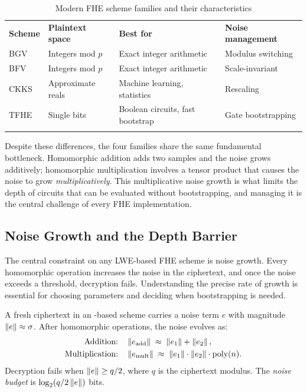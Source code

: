 \begin{table}[t]
\caption{Modern FHE scheme families and their characteristics}
\label{tab:fhe-schemes}
\begin{tabular}{p{2cm}p{3.5cm}p{3cm}p{3cm}}
\hline\noalign{\smallskip}
\textbf{Scheme} & \textbf{Plaintext space} & \textbf{Best for} & \textbf{Noise management} \\
\noalign{\smallskip}\svhline\noalign{\smallskip}
BGV & Integers mod $p$ & Exact integer arithmetic & Modulus switching \\
BFV & Integers mod $p$ & Exact integer arithmetic & Scale-invariant \\
CKKS & Approximate reals & Machine learning, statistics & Rescaling \\
TFHE & Single bits & Boolean circuits, fast bootstrap & Gate bootstrapping \\
\noalign{\smallskip}\hline
\end{tabular}
\end{table}

Despite these differences, the four families share the same fundamental bottleneck.  Homomorphic addition adds two \lwe{} samples and the noise grows additively; homomorphic multiplication involves a tensor product that causes the noise to grow \emph{multiplicatively}.  This multiplicative noise growth is what limits the depth of circuits that can be evaluated without bootstrapping, and managing it is the central challenge of every FHE implementation.


\subsection{Noise Growth and the Depth Barrier}
\label{subsec:noise-growth}

The central constraint on any LWE-based FHE scheme is noise growth.  Every homomorphic operation increases the noise in the ciphertext, and once the noise exceeds a threshold, decryption fails.  Understanding the precise rate of growth is essential for choosing parameters and deciding when bootstrapping is needed.

\begin{definition}
\label{def:noise-budget}
A fresh ciphertext in an \lwe{}-based scheme carries a noise term $e$ with magnitude $\left\lVert e \right\rVert \approx \sigma$.  After homomorphic operations, the noise evolves as:
\begin{align}
\text{Addition:}\quad & \left\lVert e_{\mathrm{add}} \right\rVert \;\approx\; \left\lVert e_1 \right\rVert + \left\lVert e_2 \right\rVert, \label{eq:noise-add}\\
\text{Multiplication:}\quad & \left\lVert e_{\mathrm{mult}} \right\rVert \;\approx\; \left\lVert e_1 \right\rVert\cdot\left\lVert e_2 \right\rVert\cdot\operatorname{poly}(n). \label{eq:noise-mult}
\end{align}
Decryption fails when $\left\lVert e \right\rVert \geq q/2$, where $q$ is the ciphertext modulus.  The \emph{noise budget} is $\log_2(q / 2\left\lVert e \right\rVert)$ bits.
\end{definition}

